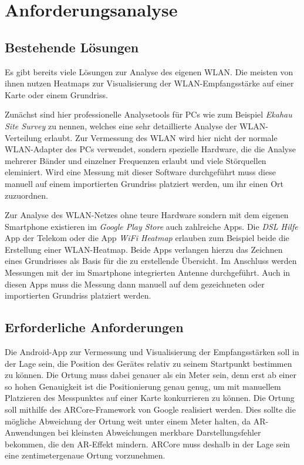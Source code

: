 \documentclass[10pt]{scrartcl}
\begin{document}
\section{Anforderungsanalyse}
\subsection{Bestehende Lösungen}
Es gibt bereits viele Lösungen zur Analyse des eigenen WLAN. Die meisten von ihnen nutzen Heatmaps zur Visualisierung der WLAN-Empfangsstärke auf einer Karte oder einem Grundriss.

Zunächst sind hier professionelle Analysetools für PCs wie zum Beispiel \textit{Ekahau Site Survey} zu nennen, welches eine sehr detaillierte Analyse der WLAN-Verteilung erlaubt. Zur Vermessung des WLAN wird hier nicht der normale WLAN-Adapter des PCs verwendet, sondern spezielle Hardware, die die Analyse mehrerer Bänder und einzelner Frequenzen erlaubt und viele Störquellen eleminiert. Wird eine Messung mit dieser Software durchgeführt muss diese manuell auf einem importierten Grundriss platziert werden, um ihr einen Ort zuzuordnen.

Zur Analyse des WLAN-Netzes ohne teure Hardware sondern mit dem eigenen Smartphone existieren im \textit{Google Play Store} auch zahlreiche Apps. Die \textit{DSL Hilfe} App der Telekom oder die App \textit{WiFi Heatmap} erlauben zum Beispiel beide die Erstellung einer WLAN-Heatmap. Beide Apps verlangen hierzu das Zeichnen eines Grundrisses als Basis für die zu erstellende Übersicht. Im Anschluss werden Messungen mit der im Smartphone integrierten Antenne durchgeführt. Auch in diesen Apps muss die Messung dann manuell auf dem gezeichneten oder importierten Grundriss platziert werden.

\subsection{Erforderliche Anforderungen}
Die Android-App zur Vermessung und Visualisierung der Empfangsstärken soll in der Lage sein, die Position des Gerätes relativ zu seinem Startpunkt bestimmen zu können. Die Ortung muss dabei genauer als ein Meter sein, denn erst ab einer so hohen Genauigkeit ist die Positionierung genau genug, um mit manuellem Platzieren des Messpunktes auf einer Karte konkurrieren zu können. Die Ortung soll mithilfe des ARCore-Framework von Google realisiert werden. Dies sollte die mögliche Abweichung der Ortung weit unter einem Meter halten, da AR-Anwendungen bei kleinsten Abweichungen merkbare Darstellungsfehler bekommen, die den AR-Effekt mindern. ARCore muss deshalb in der Lage sein eine zentimetergenaue Ortung vorzunehmen.
\end{document}
